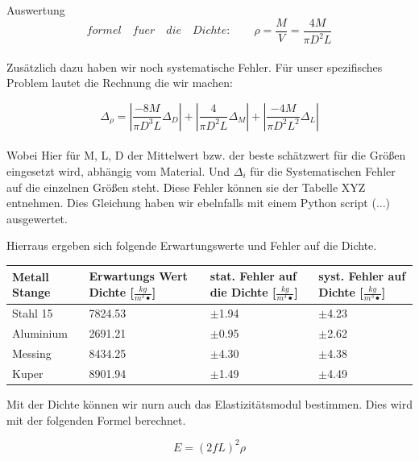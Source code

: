 \documentclass[twoside]{protokoll}
\begin{document}
\begin{aufgabe}{Auswertung}
\begin{equation}
	formel\quad fuer \quad die \quad Dichte: \qquad \rho = \frac{M}{V} = \frac{4M}{\pi D^2L}
\end{equation}\\

Zusätzlich dazu haben wir noch systematische Fehler. Für unser spezifisches Problem lautet die Rechnung die wir machen:

\begin{equation}
	\Delta_{\rho} = \left|\frac{-8M}{\pi D^3L}\Delta_D\right| + 
	\left|\frac{4}{\pi D^2L}\Delta_M\right| + 
	\left|\frac{-4M}{\pi D^2L^2}\Delta_L\right|
\end{equation}\\

Wobei Hier für M, L, D der Mittelwert bzw. der beste schätzwert für die Größen eingesetzt wird, abhängig 
vom Material. Und $\Delta_i$ für die Systematischen Fehler auf die einzelnen Größen steht. 
Diese Fehler können sie der Tabelle XYZ entnehmen. 
Dies Gleichung haben wir ebelnfalls mit einem Python script (...)
ausgewertet.

Hierraus ergeben sich folgende Erwartungswerte und Fehler auf die Dichte. 


 \begin{table}[H]
        \centering
        \begin{tabularx}{1\textwidth}{X X X X} %
            \toprule
            \textbf{Metall Stange} & \textbf{Erwartungs Wert Dichte [$\frac{kg}{m^3•}$]} & \textbf{stat. Fehler auf die Dichte [$\frac{kg}{m^3•}$]} & \textbf{syst. Fehler auf Dichte [$\frac{kg}{m^3•}$]}\\
            \midrule
            Stahl 15 & 7824.53 & $\pm$1.94 & $\pm$4.23 \\
            Aluminium & 2691.21 & $\pm$0.95 & $\pm$2.62 \\
            Messing & 8434.25 & $\pm$4.30 & $\pm$4.38 \\
            Kuper & 8901.94 & $\pm$1.49 & $\pm$4.49\\
            \bottomrule
        \end{tabularx}
        \label{tab:mytable}
    \end{table}

Mit der Dichte können wir nurn auch das Elastizitätsmodul bestimmen. Dies wird mit der folgenden Formel berechnet. 

    \begin{equation}
         E = (2fL)^2 \rho
    \end{equation}
    

\end{aufgabe}
\end{document}
